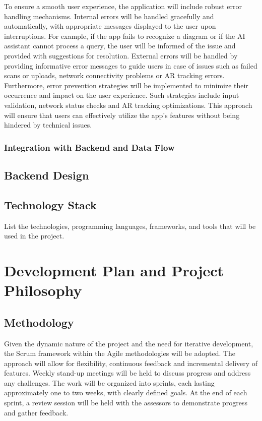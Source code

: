 \documentclass[12pt]{article}
\begin{document}
        To ensure a smooth user experience, the application will include robust error handling mechanisms. Internal errors will be handled gracefully and automatically, with appropriate messages displayed to the user upon interruptions. For example, if the app fails to recognize a diagram or if the AI assistant
        cannot process a query, the user will be informed of the issue and provided with suggestions for resolution. External errors will be handled by providing informative error messages to guide users in case of issues such as failed scans or uploads, network connectivity problems or AR tracking errors. Furthermore,
        error prevention strategies will be implemented to minimize their occurrence and impact on the user experience. Such strategies include input validation, network status checks and AR tracking optimizations. This approach will ensure that users can effectively utilize the app's features without being hindered by technical issues.



    \subsubsection{Integration with Backend and Data Flow}

        

    \subsection{Backend Design}

    \subsection{Technology Stack}
    List the technologies, programming languages, frameworks, and tools that will be used in the project.

\section{Development Plan and Project Philosophy}

    \subsection{Methodology}

    Given the dynamic nature of the project and the need for iterative development, the Scrum framework within the Agile methodologies will be adopted. The approach will allow for flexibility, continuous feedback
    and incremental delivery of features. Weekly stand-up meetings will be held to discuss progress and address any challenges. The work will be organized into sprints, each lasting approximately one to two weeks,
    with clearly defined goals. At the end of each sprint, a review session will be held with the assessors to demonstrate progress and gather feedback.
\end{document}
